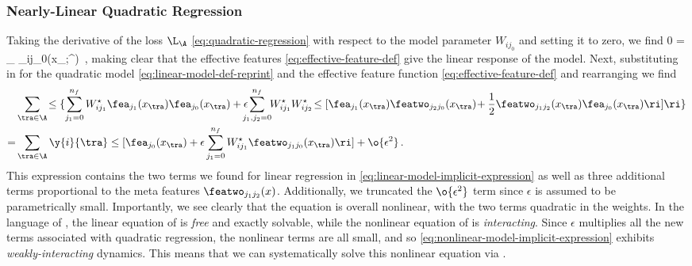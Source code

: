 \subsubsection{Nearly-Linear Quadratic Regression}
Taking the derivative of the loss $\L_\A$  \eqref{eq:quadratic-regression} with respect to the model parameter $W_{ij_0}$ and setting it to zero, we find
\be\label{eq:quadratic-optimization-implict-features}
0 = \sum_{\tra} \feaE_{ij_0}(x_{\tra};\theta^\star) \,,
\ee
making clear that the effective features \eqref{eq:effective-feature-def} give the linear response of the model.
Next, substituting in for the quadratic model \eqref{eq:linear-model-def-reprint} and the effective feature function \eqref{eq:effective-feature-def} and rearranging we find
\begin{align}\label{eq:nonlinear-model-implicit-expression}
&\sum_{\tra\in\A}\!\le\{\sum_{j_1=0}^{n_f}W^{\star}_{ij_1}\fea_{j_1}(x_{\tra})\fea_{j_0}(x_{\tra})+\epsilon\!\!\!\!\sum_{j_1,j_2=0}^{n_f}\!\!W^{\star}_{ij_1}W^{\star}_{ij_2}\!\le[\fea_{j_1}(x_{\tra})\featwo_{j_2j_0}(x_{\tra})\!+\frac{1}{2}\featwo_{j_1j_2}(x_{\tra})\fea_{j_0}(x_{\tra})\ri]\ri\}\, \notag\\
=&\sum_{\tra\in\A} \y{i}{\tra}\le[\fea_{j_0}(x_{\tra})+\epsilon\sum_{j_1=0}^{n_f}W^{\star}_{ij_1}\featwo_{j_1j_0}(x_{\tra})\ri]+\o{\epsilon^2}\, .
\end{align}
This expression contains the two terms we found for linear regression in \eqref{eq:linear-model-implicit-expression} as well as three additional terms proportional to the meta features $\featwo_{j_1j_2}(x)$. Additionally, we truncated the $\o{\epsilon^2}$ term since $\epsilon$ is assumed to be parametrically small. 
Importantly, we see clearly that the equation is overall nonlinear, with the two terms quadratic in the weights. 
In the language of , the linear equation of  is \emph{free} and exactly solvable, while the nonlinear equation of  is \emph{interacting}. Since $\epsilon$ multiplies all the new terms associated with quadratic regression, the nonlinear terms are all small, and so  \eqref{eq:nonlinear-model-implicit-expression} exhibits \emph{weakly-interacting} dynamics. This means that we can systematically solve this nonlinear equation via . %


